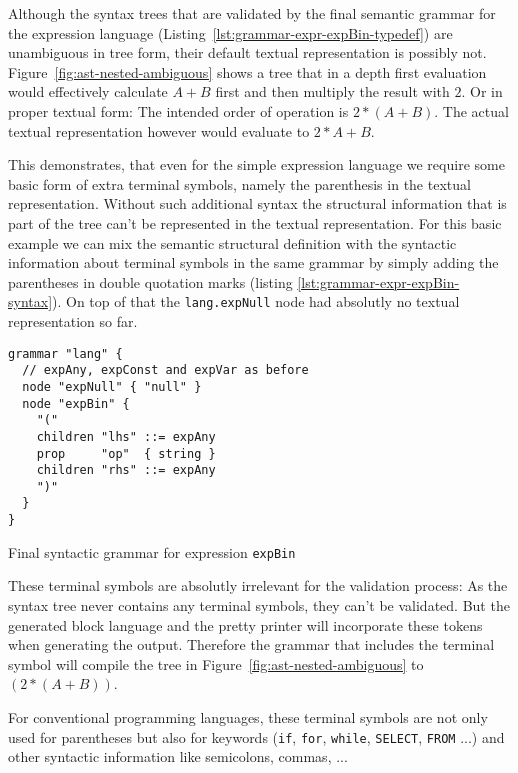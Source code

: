 \documentclass[sigconf,natbib=false,review=true,anonymous]{acmart}
\begin{document}
Although the syntax trees that are validated by the final semantic grammar for the expression language (Listing~\ref{lst:grammar-expr-expBin-typedef}) are unambiguous in tree form, their default textual representation is possibly not. Figure~\ref{fig:ast-nested-ambiguous} shows a tree that in a depth first evaluation would effectively calculate $A+B$ first and then multiply the result with $2$. Or in proper textual form: The intended order of operation is $2 * (A+B)$. The actual textual representation however would evaluate to $2 * A + B$.

This demonstrates, that even for the simple expression language we require some basic form of extra terminal symbols, namely the parenthesis in the textual representation. Without such additional syntax the structural information that is part of the tree can't be represented in the textual representation. For this basic example we can mix the semantic structural definition with the syntactic information about terminal symbols in the same grammar by simply adding the parentheses in double quotation marks (listing \ref{lst:grammar-expr-expBin-syntax}). On top of that the \texttt{lang.expNull} node had absolutly no textual representation so far.

\begin{listing}[H]
\begin{verbatim}
grammar "lang" {
  // expAny, expConst and expVar as before
  node "expNull" { "null" }
  node "expBin" {
    "("
    children "lhs" ::= expAny
    prop     "op"  { string }
    children "rhs" ::= expAny
    ")"
  }
}
\end{verbatim}
\caption{Final syntactic grammar for expression \texttt{expBin}}
\label{lst:grammar-expr-expBin-syntax}
\end{listing}

These terminal symbols are absolutly irrelevant for the validation process: As the syntax tree never contains any terminal symbols, they can't be validated. But the generated block language and the pretty printer will incorporate these tokens when generating the output. Therefore the grammar that includes the terminal symbol will compile the tree in Figure~\ref{fig:ast-nested-ambiguous} to $(2 * (A + B))$.

For conventional programming languages, these terminal symbols are not only used for parentheses but also for keywords (\texttt{if}, \texttt{for}, \texttt{while}, \texttt{SELECT}, \texttt{FROM} ...) and other syntactic information like semicolons, commas, ...
\end{document}
